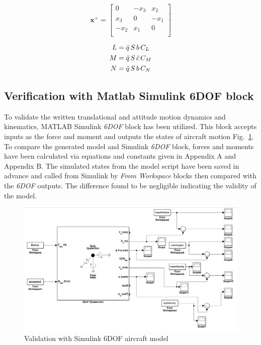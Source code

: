 \begin{equation}
\bm{x} ^ \times= \begin{bmatrix} 
0 & -x_3 & x_2 \\
x_3 & 0 & -x_1 \\
-x_2 & x_1 & 0 \\
 \end{bmatrix}
\end{equation}


\begin{align}{\label{eqn:aeroMoments}}
\begin{split}
L& = \bar{q} \, S \, b \, C_L \\
M& = \bar{q} \, S \, \bar{c} \, C_M \\
N& = \bar{q} \, S \, b \, C_N \\
\end{split}
\end{align}

\subsection{Verification with Matlab Simulink 6DOF block}

To validate the written translational and attitude motion dynamics and kinematics, MATLAB Simulink \textit{6DOF} block has been utilized.
This block accepts inputs as the force and moment and outputs the states of aircraft motion Fig.~\ref{figure:validationSimulink}.
To compare the generated model and Simulink \textit{6DOF} block, forces and moments have been calculated via equations and constants given in Appendix A and Appendix B.
The simulated states from the model script have been saved in advance and called from Simulink by \textit{From Workspace} blocks then compared with the \textit{6DOF} outputs.
The difference found to be negligible indicating the validity of the model. 


\begin{figure}
\center
\includegraphics[width=1.1\columnwidth]{figures/validationViaSimulink}
\caption{Validation with Simulink 6DOF aircraft model}
\label{figure:validationSimulink}
\end{figure}


